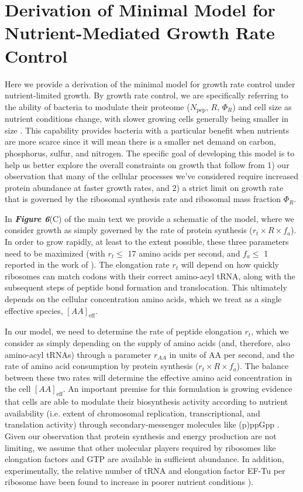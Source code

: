 \section{Derivation of Minimal Model for Nutrient-Mediated Growth Rate Control}
\label{sec:SI_model}
Here we provide a derivation of the minimal model for growth rate control under
nutrient-limited growth. By growth rate control, we are specifically referring
to the ability of bacteria to modulate their proteome ($N_\text{pep}$, $R$,
$\Phi_R$) and cell size as nutrient conditions change, with slower growing cells
generally being smaller in size \citep{ojkic2019}. This capability provides
bacteria with  a particular benefit when nutrients are more scarce since it will
mean there is a  smaller net demand on carbon, phosphorus, sulfur, and nitrogen.
The specific goal  of developing this model is to help us better explore the
overall constraints on  growth that follow from 1) our observation that many  of
the cellular processes we've considered require increased protein abundance at
faster growth rates, and 2) a strict limit on growth rate that is
governed by the ribosomal synthesis rate and ribosomal mass fraction $\Phi_R$.

In \textbf{\textit{Figure 6}}(C) of the main text we provide a schematic of the
model, where we consider growth as simply governed by the rate of protein
synthesis ($r_t \times R \times f_a$). In order to grow rapidly, at least to the
extent possible, these three parameters need to be maximized (with $r_t \leq$ 17
amino acids per second, and $f_a \leq$ 1 reported in the work of
\cite{dai2016}). The elongation rate $r_t$ will depend on how quickly
ribosomes can match codons with their correct amino-acyl tRNA, along with the
subsequent steps of peptide bond formation and translocation. This ultimately
depends on the cellular concentration amino acids, which we treat as a single
effective species, $[AA]_\text{eff}$.

In our model, we need to determine the rate of peptide elongation $r_t$, which we
consider as simply depending on the supply of amino acids (and,
therefore, also amino-acyl tRNAs) through a parameter $r_{AA}$ in units of AA
per second, and the rate of amino acid consumption by protein synthesis ($r_t
\times R \times f_a$). The balance between these two rates will determine the
effective amino acid concentration in the cell $[AA]_\text{eff}$. An important
premise for this formulation is growing evidence that cells are able to modulate
their biosynthesis activity according to nutrient availability (i.e. extent of
chromosomal replication, transcriptional, and translation activity) through
secondary-messenger molecules like (p)ppGpp \citep{hauryliuk2015, zhu2019,
kraemer2019, fernandezcoll2020, Buke2020}. Given our observation that protein
synthesis and energy production are not limiting, we assume that other molecular
players required by ribosomes like elongation factors and GTP are available in
sufficient abundance. In addition, experimentally, the relative number of tRNA
and elongation factor EF-Tu per ribosome have been found to increase in poorer
nutrient conditions \cite{pedersen1978, dong1996, klumpp2013}).


